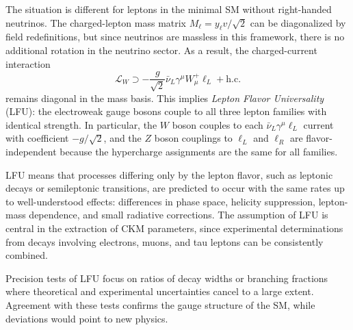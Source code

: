 The situation is different for leptons in the minimal SM without right-handed neutrinos. The charged-lepton mass matrix $M_\ell = y_\ell v/\sqrt{2}$ can be diagonalized by field redefinitions, but since neutrinos are massless in this framework, there is no additional rotation in the neutrino sector. As a result, the charged-current interaction
\begin{equation}
    \mathcal{L}_{W} \supset -\frac{g}{\sqrt{2}} \bar{\nu}_L \gamma^\mu W_\mu^+ \ell_L + \text{h.c.}
\end{equation}
remains diagonal in the mass basis. This implies \textit{Lepton Flavor Universality} (LFU): the electroweak gauge bosons couple to all three lepton families with identical strength. In particular, the $W$ boson couples to each $\bar{\nu}_L \gamma^\mu \ell_L$ current with coefficient $-g/\sqrt{2}$, and the $Z$ boson couplings to $\ell_L$ and $\ell_R$ are flavor-independent because the hypercharge assignments are the same for all families.

LFU means that processes differing only by the lepton flavor, such as leptonic decays or semileptonic transitions, are predicted to occur with the same rates up to well-understood effects: differences in phase space, helicity suppression, lepton-mass dependence, and small radiative corrections. The assumption of LFU is central in the extraction of CKM parameters, since experimental determinations from decays involving electrons, muons, and tau leptons can be consistently combined.

Precision tests of LFU focus on ratios of decay widths or branching fractions where theoretical and experimental uncertainties cancel to a large extent. Agreement with these tests confirms the gauge structure of the SM, while deviations would point to new physics.

